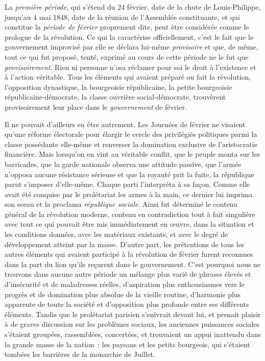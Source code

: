 \documentclass[french,twoside]{book} %
\begin{document}
\noindent La \emph{première période}, qui s’étend du 24 février, date de la chute de Louis-Philippe, jusqu’au 4 mai 1848, date de la réunion de l’Assemblée constituante, et qui constitue la \emph{période de février} proprement dite, peut être considérée comme le prologue de la révolution. Ce qui la caractérise officiellement, c’est le fait que le gouvernement improvisé par elle se déclara lui-même \emph{provisoire} et que, de même, tout ce qui fut proposé, tenté, exprimé au cours de cette période ne le fut que \emph{provisoirement}. Rien ni personne n’osa réclamer pour soi le droit à l’existence et à l’action véritable. Tous les éléments qui avaient préparé ou fait la révolution, l’opposition dynastique, la bourgeoisie républicaine, la petite bourgeoisie républicaine-démocrate, la classe ouvrière social-démocrate, trouvèrent provisoirement leur place dans le \emph{gouvernement} de février.\par
Il ne pouvait d’ailleurs en être autrement. Les Journées de février ne visaient qu’une réforme électorale pour élargir le cercle des privilégiés politiques parmi la classe possédante elle-même et renverser la domination exclusive de l’aristocratie financière. Mais lorsqu’on en vint au véritable conflit, que le peuple monta sur les barricades, que la garde nationale observa une attitude passive, que l’armée n’opposa aucune résistance sérieuse et que la royauté prit la fuite, la république parut s’imposer d’elle-même. Chaque parti l’interpréta à sa façon. Comme elle avait été conquise par le prolétariat les armes à la main, ce dernier lui imprima son sceau et la proclama \emph{république sociale}. Ainsi fut déterminé le contenu général de la révolution moderne, contenu en contradiction tout à fait singulière avec tout ce qui pouvait être mis immédiatement en œuvre, dans la situation et les conditions données, avec les matériaux existants, et avec le degré de développement atteint par la masse. D’autre part, les prétentions de tous les autres éléments qui avaient participé à la révolution de février furent reconnues dans la part du lion qu’ils reçurent dans le gouvernement. C’est pourquoi nous ne trouvons dans aucune autre période un mélange plus varié de phrases élevés et d’insécurité et de maladresses réelles, d’aspiration plus enthousiasmes vers le progrès et de domination plus absolue de la vieille routine, d’harmonie plus apparente de toute la société et d’opposition plus profonde entre ses différents éléments. Tandis que le prolétariat parisien s’enivrait devant lui, et prenait plaisir à de graves discussion sur les problèmes sociaux, les anciennes puissances sociales s’étaient groupées, rassemblées, concertées, et trouvaient un appui inattendu dans la grande masse de la nation : les paysans et les petits bourgeois, qui s’étaient tombées les barrières de la monarchie de Juillet.\par
\end{document}
